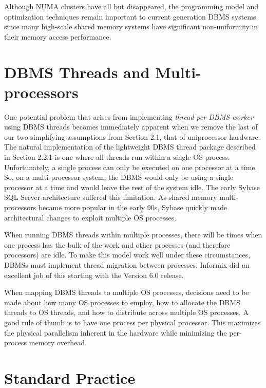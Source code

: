 \documentclass[b5paper,11pt,twoside,openright]{book}
\begin{document}
Although NUMA clusters have all but disappeared, the programming model
and optimization techniques remain important to current generation DBMS
systems since many high-scale shared memory systems have significant
non-uniformity in their memory access performance.

\hypertarget{dbms-threads-and-multi-processors}{%
\section{DBMS Threads and
Multi-processors}\label{dbms-threads-and-multi-processors}}

One potential problem that arises from implementing \emph{thread per
DBMS} \emph{worker} using DBMS threads becomes immediately apparent when
we remove the last of our two simplifying assumptions from Section 2.1,
that of uniprocessor hardware. The natural implementation of the
lightweight DBMS thread package described in Section 2.2.1 is one where
all threads run within a single OS process. Unfortunately, a single
process can only be executed on one processor at a time. So, on a
multi-processor system, the DBMS would only be using a single processor
at a time and would leave the rest of the system idle. The early Sybase
SQL Server architecture suffered this limitation. As shared memory
multi-processors became more popular in the early 90s, Sybase quickly
made architectural changes to exploit multiple OS processes.

When running DBMS threads within multiple processes, there will be times
when one process has the bulk of the work and other processes (and
therefore processors) are idle. To make this model work well under these
circumstances, DBMSs must implement thread migration between processes.
Informix did an excellent job of this starting with the Version 6.0
release.

When mapping DBMS threads to multiple OS processes, decisions need to be
made about how many OS processes to employ, how to allocate the DBMS
threads to OS threads, and how to distribute across multiple OS
processes. A good rule of thumb is to have one process per physical
processor. This maximizes the physical parallelism inherent in the
hardware while minimizing the per-process memory overhead.

\hypertarget{standard-practice-1}{%
\section{Standard Practice}\label{standard-practice-1}}
\end{document}
